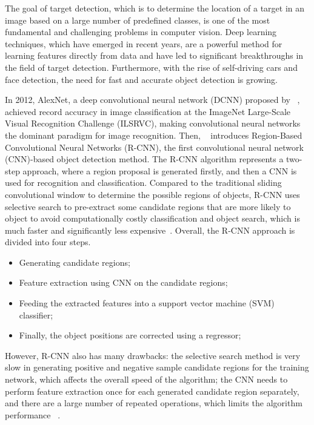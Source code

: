 The goal of target detection, which is to determine the location of a target in an image based on a large number of predefined classes, is one of the most fundamental and challenging problems in computer vision. Deep learning techniques, which have emerged in recent years, are a powerful method for learning features directly from data and have led to significant breakthroughs in the field of target detection. Furthermore, with the rise of self-driving cars and face detection, the need for fast and accurate object detection is growing.

In 2012, AlexNet, a deep convolutional neural network (DCNN) proposed by ~, achieved record accuracy in image classification at the ImageNet Large-Scale Visual Recognition Challenge (ILSRVC), making convolutional neural networks the dominant paradigm for image recognition. Then, ~ introduces Region-Based Convolutional Neural Networks (R-CNN), the first convolutional neural network (CNN)-based object detection method. The R-CNN algorithm represents a two-step approach, where a region proposal is generated firstly, and then a CNN is used for recognition and classification. Compared to the traditional sliding convolutional window to determine the possible regions of objects, R-CNN uses selective search to pre-extract some candidate regions that are more likely to object to avoid computationally costly classification and object search, which is much faster and significantly less expensive~\cite{ uijlings2013selective, girshick2014rich}. Overall, the R-CNN approach is divided into four steps.

\begin{itemize}
    \item Generating candidate regions;
    \item Feature extraction using CNN on the candidate regions;
    \item Feeding the extracted features into a support vector machine (SVM) classifier;
    \item Finally, the object positions are corrected using a regressor;
\end{itemize}

However, R-CNN also has many drawbacks: the selective search method is very slow in generating positive and negative sample candidate regions for the training network, which affects the overall speed of the algorithm; the CNN needs to perform feature extraction once for each generated candidate region separately, and there are a large number of repeated operations, which limits the algorithm performance ~\cite{huang2017speed}.


